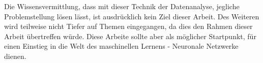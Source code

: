 \noindent
Die Wissensvermittlung, dass mit dieser Technik der Datenanalyse, jegliche Problemstellung lösen lässt, ist ausdrücklich kein Ziel dieser Arbeit. 
Des Weiteren wird teilweise nicht Tiefer auf Themen eingegangen, da dies den Rahmen dieser Arbeit übertreffen würde. 
Diese Arbeite sollte aber als möglicher Startpunkt, für einen Einstieg in die Welt des maschinellen Lernens - Neuronale Netzwerke dienen. 






